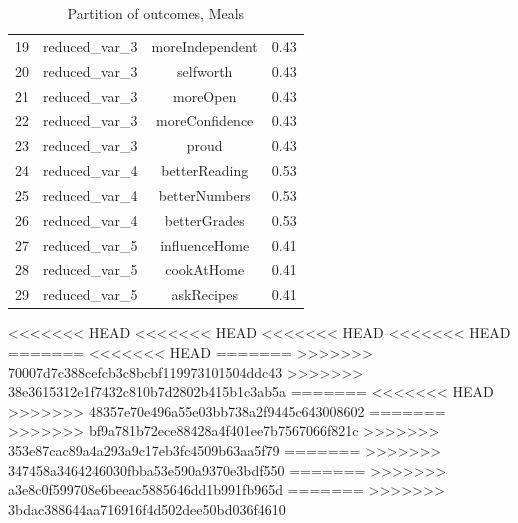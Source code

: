 \documentclass[12pt, a4paper, titlepage]{article}\usepackage[]{graphicx}\usepackage[]{color}
\begin{document}
\begin{table}[ht]
\begin{tabular}{lccc}
  19 & reduced\_var\_3 & moreIndependent & 0.43 \\ 
  20 & reduced\_var\_3 & selfworth & 0.43 \\ 
  21 & reduced\_var\_3 & moreOpen & 0.43 \\ 
  22 & reduced\_var\_3 & moreConfidence & 0.43 \\ 
  23 & reduced\_var\_3 & proud & 0.43 \\ 
  24 & reduced\_var\_4 & betterReading & 0.53 \\ 
  25 & reduced\_var\_4 & betterNumbers & 0.53 \\ 
  26 & reduced\_var\_4 & betterGrades & 0.53 \\ 
  27 & reduced\_var\_5 & influenceHome & 0.41 \\ 
  28 & reduced\_var\_5 & cookAtHome & 0.41 \\ 
  29 & reduced\_var\_5 & askRecipes & 0.41 \\ 
   \hline
\end{tabular}
\caption{Partition of outcomes, Meals} 
\label{partitionmeals}
\end{table}
<<<<<<< HEAD
<<<<<<< HEAD
<<<<<<< HEAD
<<<<<<< HEAD
=======
<<<<<<< HEAD
=======
>>>>>>> 70007d7c388cefcb3c8bcbf119973101504ddc43
>>>>>>> 38e3615312e1f7432c810b7d2802b415b1c3ab5a
=======
<<<<<<< HEAD
>>>>>>> 48357e70e496a55e03bb738a2f9445c643008602
=======
>>>>>>> bf9a781b72ece88428a4f401ee7b7567066f821c
>>>>>>> 353e87cac89a4a293a9c17eb3fc4509b63aa5f79
=======
>>>>>>> 347458a3464246030fbba53e590a9370e3bdf550
=======
>>>>>>> a3e8c0f599708e6beeac5885646dd1b991fb965d
=======
>>>>>>> 3bdac388644aa716916f4d502dee50bd036f4610
\end{document}
